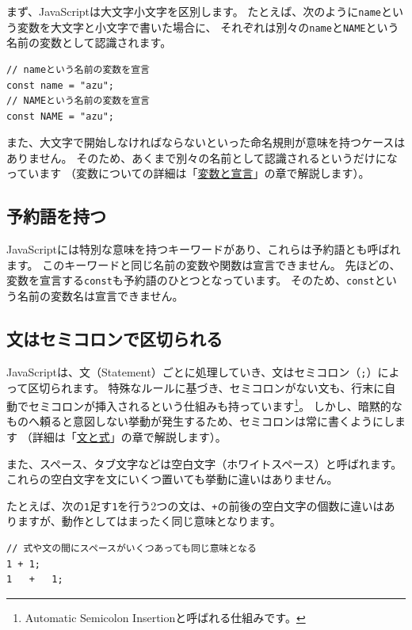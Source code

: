 まず、JavaScriptは大文字小文字を区別します。
たとえば、次のように\texttt{name}という変数を大文字と小文字で書いた場合に、
それぞれは別々の\texttt{name}と\texttt{NAME}という名前の変数として認識されます。

\begin{lstlisting}
// nameという名前の変数を宣言
const name = "azu";
// NAMEという名前の変数を宣言
const NAME = "azu";
\end{lstlisting}

また、大文字で開始しなければならないといった命名規則が意味を持つケースはありません。
そのため、あくまで別々の名前として認識されるというだけになっています
（変数についての詳細は「\hyperlink{variable-and-declaration}{変数と宣言}」の章で解説します）。

\hypertarget{reserved-keyword}{%
\subsection{予約語を持つ}\label{reserved-keyword}}

JavaScriptには特別な意味を持つキーワードがあり、これらは予約語とも呼ばれます。
このキーワードと同じ名前の変数や関数は宣言できません。
先ほどの、変数を宣言する\texttt{const}も予約語のひとつとなっています。
そのため、\texttt{const}という名前の変数名は宣言できません。

\hypertarget{statement-semicolon}{%
\subsection{文はセミコロンで区切られる}\label{statement-semicolon}}

JavaScriptは、文（Statement）ごとに処理していき、文はセミコロン（\texttt{;}）によって区切られます。
特殊なルールに基づき、セミコロンがない文も、行末に自動でセミコロンが挿入されるという仕組みも持っています\footnote{Automatic Semicolon Insertionと呼ばれる仕組みです。}。
しかし、暗黙的なものへ頼ると意図しない挙動が発生するため、セミコロンは常に書くようにします
（詳細は「\hyperlink{statement-and-expression}{文と式}」の章で解説します）。

また、スペース、タブ文字などは空白文字（ホワイトスペース）と呼ばれます。
これらの空白文字を文にいくつ置いても挙動に違いはありません。

たとえば、次の\texttt{1}足す\texttt{1}を行う2つの文は、\texttt{+}の前後の空白文字の個数に違いはありますが、動作としてはまったく同じ意味となります。

\begin{lstlisting}
// 式や文の間にスペースがいくつあっても同じ意味となる
1 + 1;
1   +   1;
\end{lstlisting}

